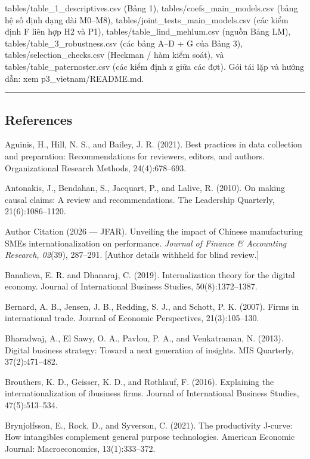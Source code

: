 \documentclass[12pt,a4paper]{article}
\begin{document}
tables/table\_1\_descriptives.csv (Bảng 1),
tables/coefs\_main\_models.csv (bảng hệ số định dạng dài M0--M8),
tables/joint\_tests\_main\_models.csv (các kiểm định F liên hợp H2 và
P1), tables/table\_lind\_mehlum.csv (nguồn Bảng LM),
tables/table\_3\_robustness.csv (các bảng A--D + G của Bảng 3),
tables/selection\_checks.csv (Heckman / hàm kiểm soát), và
tables/table\_paternoster.csv (các kiểm định z giữa các đợt). Gói tái
lặp và hướng dẫn: xem p3\_vietnam/README.md.

\begin{center}\rule{0.5\linewidth}{0.5pt}\end{center}

\hypertarget{references}{%
\subsection{References}\label{references}}

Aguinis, H., Hill, N. S., and Bailey, J. R. (2021). Best practices in
data collection and preparation: Recommendations for reviewers, editors,
and authors. Organizational Research Methods, 24(4):678--693.

Antonakis, J., Bendahan, S., Jacquart, P., and Lalive, R. (2010). On
making causal claims: A review and recommendations. The Leadership
Quarterly, 21(6):1086--1120.

Author Citation (2026 --- JFAR). Unveiling the impact of Chinese
manufacturing SMEs\textquotesingle{} internationalization on
performance. \emph{Journal of Finance \& Accounting Research, 02}(39),
287--291. {[}Author details withheld for blind review.{]}

Banalieva, E. R. and Dhanaraj, C. (2019). Internalization theory for the
digital economy. Journal of International Business Studies,
50(8):1372--1387.

Bernard, A. B., Jensen, J. B., Redding, S. J., and Schott, P. K. (2007).
Firms in international trade. Journal of Economic Perspectives,
21(3):105--130.

Bharadwaj, A., El Sawy, O. A., Pavlou, P. A., and Venkatraman, N.
(2013). Digital business strategy: Toward a next generation of insights.
MIS Quarterly, 37(2):471--482.

Brouthers, K. D., Geisser, K. D., and Rothlauf, F. (2016). Explaining
the internationalization of ibusiness firms. Journal of International
Business Studies, 47(5):513--534.

Brynjolfsson, E., Rock, D., and Syverson, C. (2021). The productivity
J-curve: How intangibles complement general purpose technologies.
American Economic Journal: Macroeconomics, 13(1):333--372.
\end{document}
